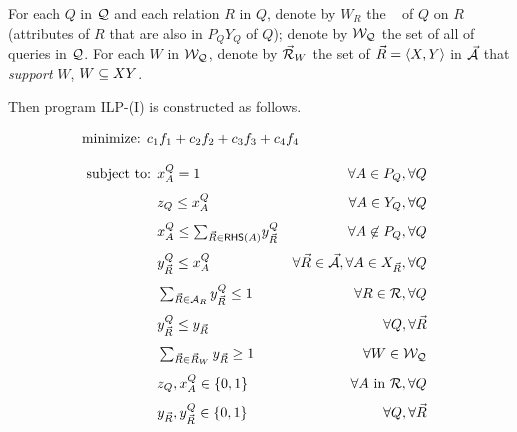 \vspace{0.36ex}
For each $Q$ in $\mathcal Q$ and each relation  $R$ in $Q$, denote by
$W_{R}$ the \qcs~\cite{blinkdb} of $Q$ on $R$ (\ie attributes of
$R$ that are also in $P_{Q}Y_{Q}$ of $Q$); denote by $\mathcal{W}_{\mathcal Q}$
the set of all \qcs of queries in $\mathcal Q$. For each \qcs $W$ in
$\mathcal{W}_{\mathcal Q}$, denote by $\vec{{\mathcal R}}_{W}$ the set of \bss $\vec{R}\allowbreak
=\allowbreak \langle X,\allowbreak Y\rangle$ in $\vec{{\mathcal A}}$ that {\em support} $W$, \ie
$W\allowbreak\subseteq\allowbreak XY$. 


\vspace{0.6ex}
Then program ILP-(I) is constructed as follows.

\vspace{-1ex}
\begin{tcolorbox}
  \begin{alignat}{2}
\hspace{-1.25cm}\text{minimize: } & c_{1}f_{1}+c_{2}f_{2}+c_{3}f_{3}+c_{4}f_{4}~~~~~~~~~~~~~~~~  &  
  \end{alignat}
  
  \vspace{-4.3ex}
  
  \begin{alignat}{2}
   \hspace*{-0.15cm}\text{subject to: }&  x_{A}^{Q} = 1 & \forall
    A\in P_{Q}, \forall Q \\[0.8ex] 
    & z_{Q}\leq x_{A}^{Q} & \forall A \in Y_{Q},\forall Q \\[0.8ex]
    & x_{A}^{Q} \leq\textstyle \sum_{\kb{R}\in \RHS(A)}\!y_{\kb{R}}^{Q} &~\forall
    A\not\in P_{Q}, \forall Q \\[0.8ex]
    & y_{\kb{R}}^{Q} \leq x_{A}^{Q} & \forall \kb{R}\in \kb{\A}, \forall A\in X_{\kb{R}}, \forall
    Q\\[0.8ex]
    & \textstyle \sum_{\kb{R}\in \A_{R}} y_{\kb{R}}^{Q} \leq 1 & 
    \forall R\in \R, \forall Q \\[0.8ex]
    & y_{\kb{R}}^{Q} \leq y_{\kb{R}} & \forall Q, \forall \kb{R} \\[0.8ex]
    & \textstyle\sum_{\kb{R}\in \kb{R}_{W}} y_{\kb{R}} \geq 1 & \forall W\in \Wc_{\Q} \\[0.8ex]
    & z_{Q}, x_{A}^{Q} \in \{0, 1\} & \forall
    A\text{ in }\R, \forall Q\\[0.8ex]
    & y_{\kb{R}}, y_{\kb{R}}^{Q} \in \{0, 1\} & \forall Q, \forall
    \kb{R} 
  \end{alignat}
  \end{tcolorbox}

